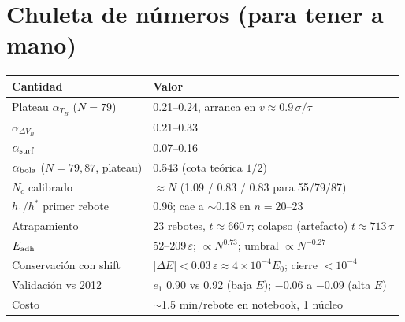 \documentclass[11pt,a4paper]{article}
\newcommand{\eps}{\varepsilon}
\begin{document}
\section*{Chuleta de números (para tener a mano)}

\begin{center}
\begin{tabular}{ll}
\toprule
\textbf{Cantidad} & \textbf{Valor} \\
\midrule
Plateau $\alpha_{T_B}$ ($N=79$) & 0.21--0.24, arranca en $v\approx0.9\,\sigma/\tau$ \\
$\alpha_{\Delta V_B}$ & 0.21--0.33 \\
$\alpha_{\rm surf}$ & 0.07--0.16 \\
$\alpha_{\rm bola}$ ($N=79,87$, plateau) & 0.543 (cota teórica $1/2$) \\
$N_c$ calibrado & $\approx N$ (1.09 / 0.83 / 0.83 para 55/79/87) \\
$h_1/h^*$ primer rebote & 0.96; cae a $\sim$0.18 en $n=20$--23 \\
Atrapamiento & 23 rebotes, $t\approx660\,\tau$; colapso (artefacto) $t\approx713\,\tau$ \\
$E_{\rm adh}$ & 52--209$\,\eps$; $\propto N^{0.73}$; umbral $\propto N^{-0.27}$ \\
Conservación con shift & $|\Delta E|<0.03\,\eps\approx4\times10^{-4}E_0$; cierre $<10^{-4}$ \\
Validación vs 2012 & $e_1$ 0.90 vs 0.92 (baja $E$); $-0.06$ a $-0.09$ (alta $E$) \\
Costo & $\sim$1.5 min/rebote en notebook, 1 núcleo \\
\bottomrule
\end{tabular}
\end{center}
\end{document}
